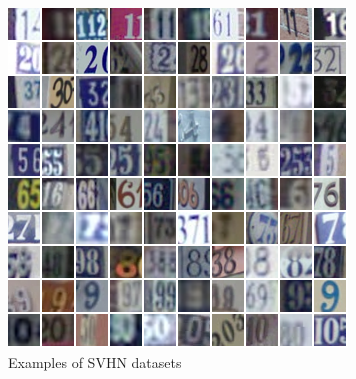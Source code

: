 \begin{figure}[h]
	\includegraphics[scale=0.5]{figures/svhn}
	\centering
	\caption{Examples of SVHN datasets \cite{netzer2011reading}}
	\label{fig:svhn}
\end{figure}

